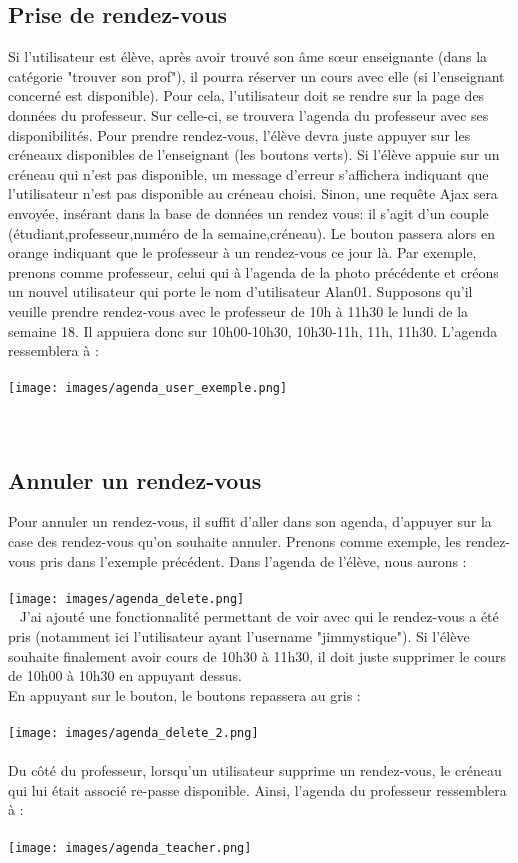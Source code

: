 \documentclass{article}%
\begin{document}
\subsection{Prise de rendez-vous}
Si l'utilisateur est élève, après avoir trouvé son âme sœur enseignante (dans la catégorie "trouver son prof"), il pourra réserver un cours avec elle (si l'enseignant concerné est disponible). Pour cela, l'utilisateur doit se rendre sur la page des données du professeur. Sur celle-ci, se trouvera l'agenda du professeur avec ses disponibilités. Pour prendre rendez-vous, l'élève devra juste appuyer sur les créneaux disponibles de l'enseignant (les boutons verts). Si l'élève appuie sur un créneau qui n'est pas disponible, un message d'erreur s'affichera indiquant que l'utilisateur n'est pas disponible au créneau choisi. Sinon, une requête Ajax sera envoyée, insérant dans la base de données un rendez vous: il s'agit d'un couple (étudiant,professeur,numéro de la semaine,créneau). Le bouton passera alors en orange  indiquant que le professeur à un rendez-vous ce jour là. Par exemple, prenons comme professeur, celui qui à l'agenda de la photo précédente et créons un nouvel utilisateur qui porte le nom d'utilisateur Alan01. Supposons qu'il veuille prendre rendez-vous avec le professeur  de 10h à 11h30 le lundi de la semaine 18. Il appuiera donc sur 10h00-10h30, 10h30-11h, 11h, 11h30. L'agenda ressemblera à : \\\\

\texttt{[image: images/agenda\_user\_exemple.png]} \\\\\\
\subsection{Annuler un rendez-vous}
Pour annuler un rendez-vous, il suffit d'aller dans son agenda, d'appuyer sur la case des rendez-vous qu'on souhaite annuler. 
Prenons comme exemple, les rendez-vous pris dans l'exemple précédent. 
Dans l'agenda de l'élève, nous aurons : \\\\
\texttt{[image: images/agenda\_delete.png]}
\\\ \newpage
J'ai ajouté une fonctionnalité permettant de voir avec qui le rendez-vous a été pris (notamment ici l'utilisateur ayant l'username "jimmystique"). Si l'élève souhaite finalement avoir cours de 10h30 à 11h30, il doit juste supprimer le cours de 10h00 à 10h30 en appuyant dessus. \\
En appuyant sur le bouton, le boutons repassera au gris : \\\\
\texttt{[image: images/agenda\_delete\_2.png]}
\\\\
Du côté du professeur, lorsqu'un utilisateur supprime un rendez-vous, le créneau qui lui était associé re-passe disponible. Ainsi, l'agenda du professeur ressemblera à : \\\\
\texttt{[image: images/agenda\_teacher.png]}
\\\\
\end{document}
